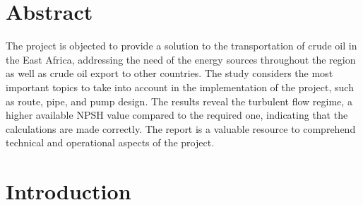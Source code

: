 \documentclass[12pt]{article}
\begin{document}
     \newpage
     \tableofcontents
     \newpage
	

      \section{Abstract}

      {\fontsize{12pt}{12pt}

      \hspace*{1em} The project is objected to provide a solution to the transportation of crude oil in the East Africa, addressing the need of the energy sources throughout the region as well as crude oil export to other countries. The study considers the most important topics to take into account in the implementation of the project, such as route, pipe, and pump design. The results reveal the turbulent flow regime, a higher available NPSH value compared to the required one, indicating that the calculations are made correctly. The report is a valuable resource to comprehend technical and operational aspects of the project.
      }

      \section{Introduction}
\end{document}
